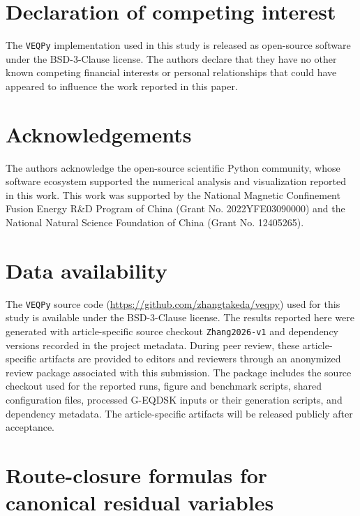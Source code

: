 \documentclass[final, 3p, times]{elsarticle}
\makeatletter
\newcommand{\appendixlabel}[1]{%
  \begingroup
  \protected@edef\@currentlabel{\@Alph\c@section}%
  \label{#1}%
  \endgroup
}
\makeatother
\begin{document}
\section*{Declaration of competing interest}
The \texttt{VEQPy} implementation used in this study is released as open-source software under the BSD-3-Clause license. The authors declare that they have no other known competing financial interests or personal relationships that could have appeared to influence the work reported in this paper.

\section*{Acknowledgements}
The authors acknowledge the open-source scientific Python community, whose software ecosystem supported the numerical analysis and visualization reported in this work. This work was supported by the National Magnetic Confinement Fusion Energy R\&D Program of China (Grant No. 2022YFE03090000) and the National Natural Science Foundation of China (Grant No. 12405265).

\section*{Data availability}
The \texttt{VEQPy} source code (\url{https://github.com/zhangtakeda/veqpy}) used for this study is available under the BSD-3-Clause license. The results reported here were generated with article-specific source checkout \texttt{Zhang2026-v1} and dependency versions recorded in the project metadata. During peer review, these article-specific artifacts are provided to editors and reviewers through an anonymized review package associated with this submission. The package includes the source checkout used for the reported runs, figure and benchmark scripts, shared configuration files, processed G-EQDSK inputs or their generation scripts, and dependency metadata. The article-specific artifacts will be released publicly after acceptance.

\appendix
\section{Route-closure formulas for canonical residual variables}
\appendixlabel{app:route-closures}
\end{document}
